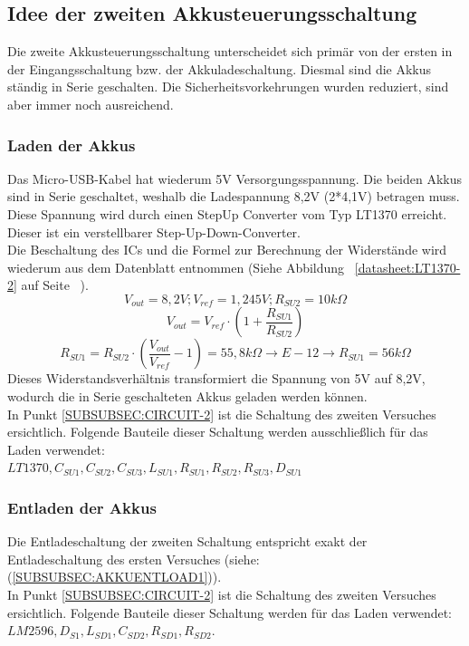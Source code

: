 \documentclass[12pt,a4paper]{article}
\begin{document}
\subsection{Idee der zweiten Akkusteuerungsschaltung}
\label{SUBSEC:AKKUSTEUR2}

Die zweite Akkusteuerungsschaltung unterscheidet sich primär von der ersten in der Eingangsschaltung bzw. der Akkuladeschaltung. Diesmal sind die Akkus ständig in Serie geschalten. Die Sicherheitsvorkehrungen wurden reduziert, sind aber immer noch ausreichend.

\subsubsection{Laden der Akkus}
\label{SUBSUBSEC:AKKULOAD2}

Das Micro-USB-Kabel hat wiederum 5V Versorgungsspannung. Die beiden Akkus sind in Serie geschaltet, weshalb die Ladespannung 8,2V (2*4,1V) betragen muss. Diese Spannung wird durch einen StepUp Converter vom Typ LT1370 erreicht. Dieser ist ein verstellbarer Step-Up-Down-Converter. \\
Die Beschaltung des ICs und die Formel zur Berechnung der Widerstände wird wiederum aus dem Datenblatt entnommen (Siehe Abbildung ~\ref{datasheet:LT1370-2} auf Seite ~\pageref{datasheet:LT1370-2}). \\
\[V_{out}=8,2V;V_{ref}=1,245V;R_{SU2}=10k\Omega\]
\[V_{out}=V_{ref} \cdot \left( 1 + \frac{R_{SU1}}{R_{SU2}} \right)\]
\[R_{SU1} = R_{SU2} \cdot \left( \frac{V_{out}}{V_{ref}} - 1 \right) = 55,8 k\Omega \rightarrow E-12 \rightarrow R_{SU1} = 56 k \Omega\]
Dieses Widerstandsverhältnis transformiert die Spannung von 5V auf 8,2V, wodurch die in Serie geschalteten Akkus geladen werden können.  \\
In Punkt \ref{SUBSUBSEC:CIRCUIT-2} ist die Schaltung des zweiten Versuches ersichtlich. Folgende Bauteile dieser Schaltung werden ausschließlich für das Laden verwendet:\\ $LT1370,C_{SU1},C_{SU2},C_{SU3}, L_{SU1},R_{SU1},R_{SU2},R_{SU3},D_{SU1}$ 

\subsubsection{Entladen der Akkus}
\label{SUBSUBSEC:AKKUENTLOAD2}

Die Entladeschaltung der zweiten Schaltung entspricht exakt der Entladeschaltung des ersten Versuches (siehe:  (\ref{SUBSUBSEC:AKKUENTLOAD1})).\\
In Punkt \ref{SUBSUBSEC:CIRCUIT-2} ist die Schaltung des zweiten Versuches ersichtlich. Folgende Bauteile dieser Schaltung werden für das Laden verwendet:\\ $LM2596,D_{S1},L_{SD1},C_{SD2},R_{SD1},R_{SD2}$. 
\end{document}
